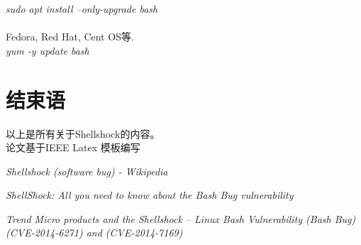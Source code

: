 \documentclass[11pt,journal,compsoc]{IEEEtran}
\begin{document}
\begin{CJK}{UTF8}{gkai}
\emph{sudo apt install --only-upgrade bash}\\\\
Fedora, Red Hat, Cent OS等.\\

\emph{yum -y update bash}

\section{结束语}
以上是所有关于Shellshock的内容。\\
论文基于IEEE Latex 模板编写

\ifCLASSOPTIONcaptionsoff
  \newpage
\fi

\begin{thebibliography}{1}
\emph{Shellshock (software bug) - Wikipedia}

\emph{ShellShock: All you need to know about the Bash Bug vulnerability}

\emph{Trend Micro products and the Shellshock – Linux Bash Vulnerability (Bash Bug) (CVE-2014-6271) and (CVE-2014-7169)}
\end{thebibliography}

\end{CJK} 
\end{document}
